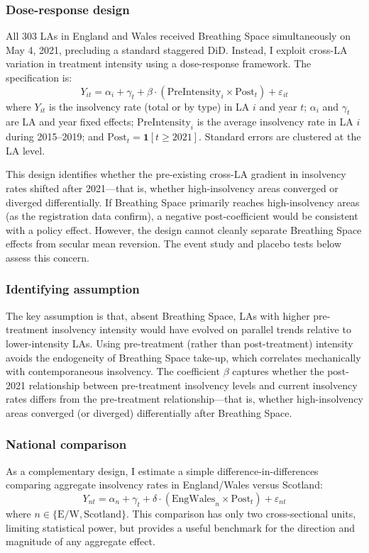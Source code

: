 \documentclass[12pt]{article}
\begin{document}
\subsubsection*{Dose-response design} All 303 LAs in England and Wales received Breathing Space simultaneously on May 4, 2021, precluding a standard staggered DiD. Instead, I exploit cross-LA variation in treatment intensity using a dose-response framework. The specification is:
\begin{equation}
Y_{it} = \alpha_i + \gamma_t + \beta \cdot (\text{PreIntensity}_i \times \text{Post}_t) + \varepsilon_{it}
\label{eq:dose}
\end{equation}
where $Y_{it}$ is the insolvency rate (total or by type) in LA $i$ and year $t$; $\alpha_i$ and $\gamma_t$ are LA and year fixed effects; $\text{PreIntensity}_i$ is the average insolvency rate in LA $i$ during 2015--2019; and $\text{Post}_t = \mathbf{1}[t \geq 2021]$. Standard errors are clustered at the LA level.

This design identifies whether the pre-existing cross-LA gradient in insolvency rates shifted after 2021---that is, whether high-insolvency areas converged or diverged differentially. If Breathing Space primarily reaches high-insolvency areas (as the registration data confirm), a negative post-coefficient would be consistent with a policy effect. However, the design cannot cleanly separate Breathing Space effects from secular mean reversion. The event study and placebo tests below assess this concern.

\subsubsection*{Identifying assumption} The key assumption is that, absent Breathing Space, LAs with higher pre-treatment insolvency intensity would have evolved on parallel trends relative to lower-intensity LAs. Using pre-treatment (rather than post-treatment) intensity avoids the endogeneity of Breathing Space take-up, which correlates mechanically with contemporaneous insolvency. The coefficient $\beta$ captures whether the post-2021 relationship between pre-treatment insolvency levels and current insolvency rates differs from the pre-treatment relationship---that is, whether high-insolvency areas converged (or diverged) differentially after Breathing Space.

\subsubsection*{National comparison} As a complementary design, I estimate a simple difference-in-differences comparing aggregate insolvency rates in England/Wales versus Scotland:
\begin{equation}
Y_{nt} = \alpha_n + \gamma_t + \delta \cdot (\text{EngWales}_n \times \text{Post}_t) + \varepsilon_{nt}
\label{eq:national}
\end{equation}
where $n \in \{\text{E/W}, \text{Scotland}\}$. This comparison has only two cross-sectional units, limiting statistical power, but provides a useful benchmark for the direction and magnitude of any aggregate effect.
\end{document}
